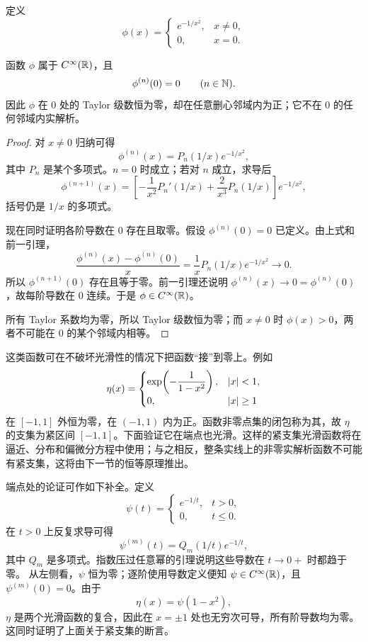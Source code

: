 定义
\[
 \phi(x)=
 \begin{cases}
  e^{-1/x^2},&x\ne0,\\
  0,&x=0.
 \end{cases}
\]

\begin{theorem}[无穷阶平坦函数]
\label{thm:flat-function}
函数 \(\phi\) 属于 \(C^\infty(\mathbb{R})\)，且
\[
 \phi^{(n)}(0)=0\qquad(n\in\mathbb{N}).
\]
因此 \(\phi\) 在 \(0\) 处的 Taylor 级数恒为零，却在任意删心邻域内为正；它不在 \(0\) 的任何邻域内实解析。
\end{theorem}

\begin{proof}
对 \(x\ne0\) 归纳可得
\[
 \phi^{(n)}(x)=P_n(1/x)e^{-1/x^2},
\]
其中 \(P_n\) 是某个多项式。\(n=0\) 时成立；若对 \(n\) 成立，求导后
\[
 \phi^{(n+1)}(x)
 =\left[-\frac1{x^2}P_n'(1/x)+\frac2{x^3}P_n(1/x)\right]e^{-1/x^2},
\]
括号仍是 \(1/x\) 的多项式。

现在同时证明各阶导数在 \(0\) 存在且取零。假设 \(\phi^{(n)}(0)=0\) 已定义。由上式和前一引理，
\[
 \frac{\phi^{(n)}(x)-\phi^{(n)}(0)}{x}
 =\frac1x P_n(1/x)e^{-1/x^2}\longrightarrow0.
\]
所以 \(\phi^{(n+1)}(0)\) 存在且等于零。前一引理还说明 \(\phi^{(n)}(x)\to0=\phi^{(n)}(0)\)，故每阶导数在 \(0\) 连续。于是 \(\phi\in C^\infty(\mathbb{R})\)。

所有 Taylor 系数均为零，所以 Taylor 级数恒为零；而 \(x\ne0\) 时 \(\phi(x)>0\)，两者不可能在 \(0\) 的某个邻域内相等。
\end{proof}

这类函数可在不破坏光滑性的情况下把函数“接”到零上。例如
\[
 \eta(x)=
 \begin{cases}
  \exp\!\left(-\dfrac1{1-x^2}\right),&\left|x\right|<1,\\
  0,&\left|x\right|\ge1
 \end{cases}
\]
在 \([-1,1]\) 外恒为零，在 \((-1,1)\) 内为正。函数非零点集的闭包称为其，故 \(\eta\) 的支集为紧区间 \([-1,1]\)。下面验证它在端点也光滑。这样的紧支集光滑函数将在逼近、分布和偏微分方程中使用；与之相反，整条实线上的非零实解析函数不可能有紧支集，这将由下一节的恒等原理推出。

端点处的论证可作如下补全。定义
\[
 \psi(t)=
 \begin{cases}
  e^{-1/t},&t>0,\\
  0,&t\le0.
 \end{cases}
\]
在 \(t>0\) 上反复求导可得
\[
 \psi^{(m)}(t)=Q_m(1/t)e^{-1/t},
\]
其中 \(Q_m\) 是多项式。指数压过任意幂的引理说明这些导数在 \(t\to0+\) 时都趋于零。
从左侧看，\(\psi\) 恒为零；逐阶使用导数定义便知 \(\psi\in C^\infty(\mathbb{R})\)，且
\(\psi^{(m)}(0)=0\)。由于
\[
 \eta(x)=\psi(1-x^2),
\]
\(\eta\) 是两个光滑函数的复合，因此在 \(x=\pm1\) 处也无穷次可导，所有阶导数均为零。
这同时证明了上面关于紧支集的断言。


